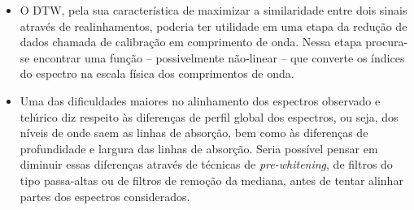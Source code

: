 \begin{itemize}



\item O DTW, pela sua característica de maximizar a similaridade entre dois sinais através de realinhamentos, poderia ter utilidade em uma etapa da redução de dados chamada de calibração em comprimento de onda. Nessa etapa procura-se encontrar uma função -- possivelmente não-linear -- que converte os índices do espectro na escala física dos comprimentos de onda. 

\item Uma das dificuldades maiores no alinhamento dos espectros observado e telúrico diz respeito às diferenças de perfil global dos espectros, ou seja, dos níveis de onde saem as linhas de absorção, bem como às diferenças de profundidade e largura das linhas de absorção. Seria possível pensar em diminuir essas diferenças através de técnicas de \textit{pre-whitening}, de filtros do tipo passa-altas ou de filtros de remoção da mediana, antes de tentar alinhar partes dos espectros considerados. %


\end{itemize}
